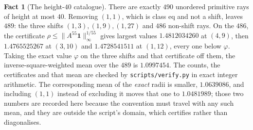 \documentclass[11pt]{amsart}
\theoremstyle{definition}
\newtheorem{fact}[theorem]{Fact}
\theoremstyle{remark}
\begin{document}
\begin{fact}[The height-$40$ catalogue]
\label{fact:catalogue}
There are exactly $490$ unordered primitive rays of height at most $40$. Removing $(1,1)$, which is class eq and not a shift, leaves $489$: the three shifts $(1,3), (1,9), (1,27)$ and $486$ non-shift rays. On the $486$, the certificate $\rho \le \|A^{55}\mathbf 1\|_\infty^{1/55}$ gives largest values $1.4812034260$ at $(4,9)$, then $1.4765525267$ at $(3,10)$ and $1.4728541511$ at $(1,12)$, every one below $\varphi$. Taking the exact value $\varphi$ on the three shifts and that certificate off them, the inverse-square-weighted mean over the $489$ is $1.0997454$. The counts, the certificates and that mean are checked by \texttt{scripts/verify.py} in exact integer arithmetic. The corresponding mean of the \emph{exact} radii is smaller, $1.0639086$, and including $(1,1)$ instead of excluding it moves that one to $1.0481989$; those two numbers are recorded here because the convention must travel with any such mean, and they are outside the script's domain, which certifies rather than diagonalises.
\end{fact}
\end{document}
